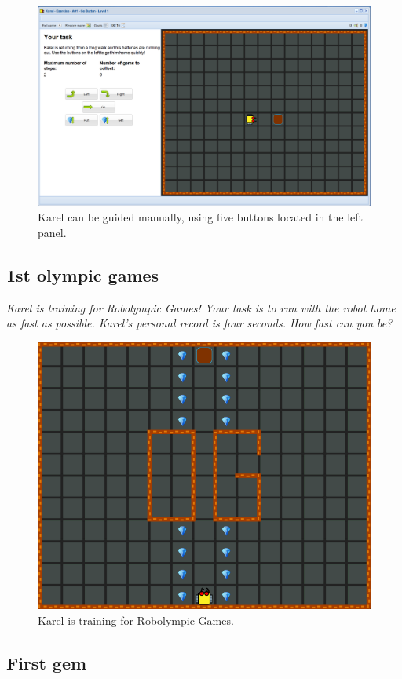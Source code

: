 \begin{figure}[!ht]
\begin{center}
\includegraphics[height=0.30\textwidth]{img/a01b.png}
\end{center}
\vspace{-4mm}
\caption{Karel can be guided manually, using five buttons located in the left panel.}
\label{fig:a01b}
\vspace{-10mm}
\end{figure}

\newpage
\subsection{1st olympic games}

{\em Karel is training for Robolympic Games! Your task is to run with 
the robot home as fast as possible. Karel's personal record is four seconds. How fast can you be?}

\begin{figure}[!ht]
\begin{center}
\includegraphics[height=0.4\textwidth]{img/a02.png}
\end{center}
\vspace{-4mm}
\caption{Karel is training for Robolympic Games.}
\label{fig:a02}
\vspace{-4mm}
\end{figure}
\noindent

\subsection{First gem}

